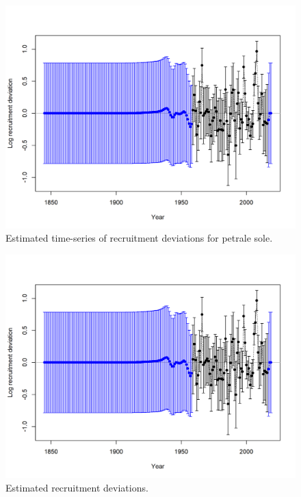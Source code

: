 \documentclass[12pt,]{article}
\begin{document}
\FloatBarrier

\begin{figure}
\centering
\includegraphics{r4ss/plots_mod1/recdevs2_withbars.png}
\caption{Estimated time-series of recruitment deviations for petrale
sole. \label{fig:recdevs}}
\end{figure}

\FloatBarrier

\begin{figure}
\centering
\includegraphics{r4ss/plots_mod1/recdevs2_withbars.png}
\caption{Estimated recruitment deviations. \label{fig:rec_devs}}
\end{figure}
\end{document}
